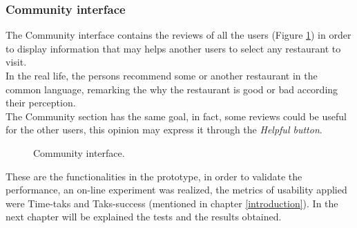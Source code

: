 \subsubsection{Community interface}

The Community interface contains the reviews of all the users  
(Figure  \ref{fig:community}) in order to display information that may helps
another users to select any restaurant to visit. \\In the real life, the
persons recommend some or another restaurant in the common  language,
remarking the why the restaurant is good or bad according  their
perception. \\The Community section has the same goal, in fact,  some
reviews could be useful for the other users, this opinion may  express
it through the \textit{Helpful button}.
\begin{figure}
\captionsetup{font=footnotesize}
\centering
{}
\caption{Community interface.}
\label{fig:community}   
\end{figure}
These are the functionalities in the prototype, in order to validate
the performance, an on-line experiment was realized, the metrics 
of usability applied were Time-taks and Taks-success (mentioned 
in chapter  \ref{introduction}). In the next chapter will be 
explained the tests and the results obtained.







